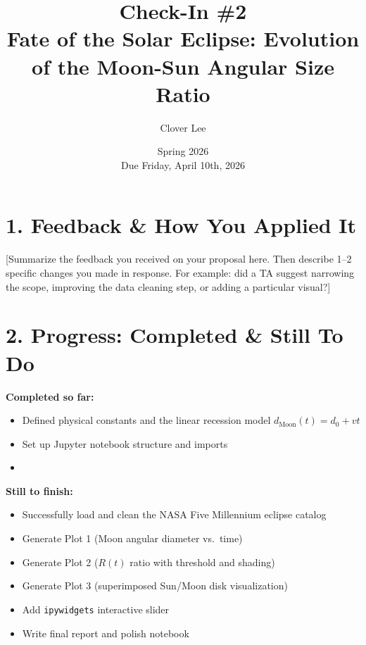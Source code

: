 \documentclass[11pt]{article}
\title{Check-In \#2\\
\large Fate of the Solar Eclipse: Evolution of the Moon-Sun Angular Size Ratio}
\author{Clover Lee}
\date{Spring 2026 \\ \small Due Friday, April 10th, 2026}
\begin{document}
\maketitle

\section*{1. Feedback \& How You Applied It}

[Summarize the feedback you received on your proposal here.
Then describe 1--2 specific changes you made in response.
For example: did a TA suggest narrowing the scope, improving
the data cleaning step, or adding a particular visual?]


\section*{2. Progress: Completed \& Still To Do}

\textbf{Completed so far:}
\begin{itemize}
    \item Defined physical constants and the linear recession model
          $d_\mathrm{Moon}(t) = d_0 + vt$
    \item Set up Jupyter notebook structure and imports
    \item [Add any other completed items here]
\end{itemize}

\textbf{Still to finish:}
\begin{itemize}
    \item Successfully load and clean the NASA Five Millennium eclipse catalog
    \item Generate Plot 1 (Moon angular diameter vs.\ time)
    \item Generate Plot 2 ($R(t)$ ratio with threshold and shading)
    \item Generate Plot 3 (superimposed Sun/Moon disk visualization)
    \item Add \texttt{ipywidgets} interactive slider
    \item Write final report and polish notebook
\end{itemize}
\end{document}
